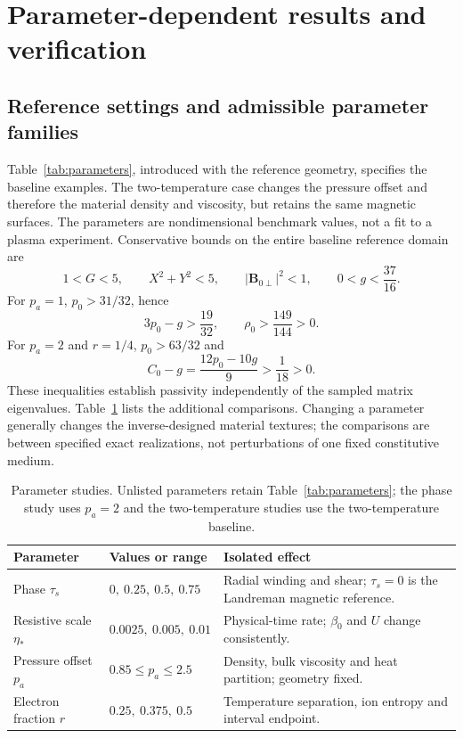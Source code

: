 \documentclass[11pt,a4paper]{article}
\theoremstyle{remark}\newtheorem{remark}{Remark}
\numberwithin{equation}{section}
\newcommand{\BB}{\boldsymbol B}
\begin{document}
\section{Parameter-dependent results and verification}\label{sec:verification}
\subsection{Reference settings and admissible parameter families}
Table~\ref{tab:parameters}, introduced with the reference geometry, specifies the baseline examples. The two-temperature case changes the pressure offset and therefore the material density and viscosity, but retains the same magnetic surfaces. The parameters are nondimensional benchmark values, not a fit to a plasma experiment. Conservative bounds on the entire baseline reference domain are
\begin{equation}
1<G<5,\qquad X^2+Y^2<5,\qquad
|\BB_{0\perp}|^2<1,\qquad 0<g<\frac{37}{16}.
\label{eq:domainbounds}
\end{equation}
For $p_a=1$, $p_0>31/32$, hence
\begin{equation}
3p_0-g>\frac{19}{32},\qquad \rho_0>\frac{149}{144}>0.
\label{eq:passivitybounds}
\end{equation}
For $p_a=2$ and $r=1/4$, $p_0>63/32$ and
\begin{equation}
C_0-g=\frac{12p_0-10g}{9}>\frac1{18}>0.
\label{eq:twopassivity}
\end{equation}
These inequalities establish passivity independently of the sampled matrix eigenvalues. Table~\ref{tab:sweeps} lists the additional comparisons. Changing a parameter generally changes the inverse-designed material textures; the comparisons are between specified exact realizations, not perturbations of one fixed constitutive medium.
\begin{table}[H]
\centering\small
\caption{Parameter studies. Unlisted parameters retain Table~\ref{tab:parameters}; the phase study uses $p_a=2$ and the two-temperature studies use the two-temperature baseline.}
\label{tab:sweeps}
\begin{tabularx}{\linewidth}{@{}p{.17\linewidth}p{.32\linewidth}X@{}}\toprule
Parameter & Values or range & Isolated effect\\\midrule
Phase $\tau_s$ & $0,\ 0.25,\ 0.5,\ 0.75$ & Radial winding and shear; $\tau_s=0$ is the Landreman magnetic reference.\\
Resistive scale $\eta_*$ & $0.0025,\ 0.005,\ 0.01$ & Physical-time rate; $\beta_0$ and $U$ change consistently.\\
Pressure offset $p_a$ & $0.85\le p_a\le2.5$ & Density, bulk viscosity and heat partition; geometry fixed.\\
Electron fraction $r$ & $0.25,\ 0.375,\ 0.5$ & Temperature separation, ion entropy and interval endpoint.\\\bottomrule
\end{tabularx}
\end{table}
\end{document}
